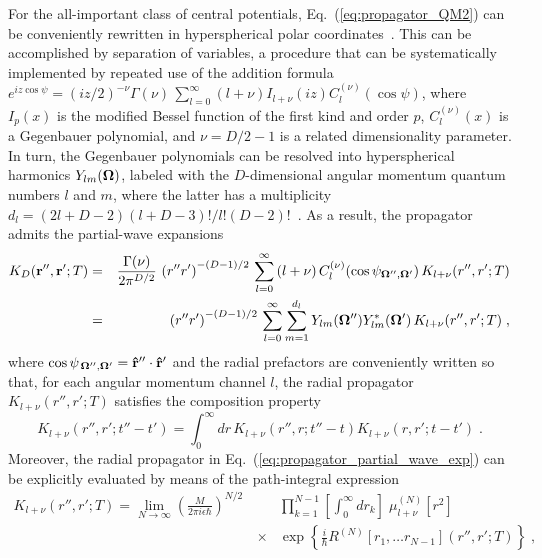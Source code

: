 \documentclass[a4paper,preprint,draft,showpacs,amsmath,amsfonts,amssymb,aps,prd]{revtex4}%
\begin{document}
For the all-important class of central potentials,
Eq.~(\ref{eq:propagator_QM2}) can be conveniently rewritten 
in hyperspherical  polar coordinates~\cite{cam:00,cam:01,erd:53}.
This can be accomplished by separation of variables, 
a procedure that can be systematically
implemented by repeated use of the addition formula~\cite{wat:44}
$e^{iz\cos \psi}
=
(iz/2)^{-\nu} \Gamma (\nu)
\,
 \sum_{l=0}^{\infty} 
(l+\nu)
I_{l+\nu} (iz ) C_{l}^{(\nu)} (\cos \psi )$,
where $I_{p}(x)$ 
is the modified Bessel function of the first kind and order $p$,
$C_{l}^{(\nu)}(x)$ is a Gegenbauer polynomial, and
$\nu =D/2 -1$ is a related dimensionality parameter.
In turn, the Gegenbauer polynomials can be resolved into 
hyperspherical harmonics
$Y_{l m} ({\bf \Omega})$, 
labeled with the $D$-dimensional angular momentum quantum numbers
$l$ and $m$, where the latter has a multiplicity
 $d_{l}= (2l+D-2)(l+D-3)!/l!(D-2)!$~\cite{erd:53}.
As a result,
the propagator admits the
partial-wave expansions
\begin{eqnarray}
K_{D}({\bf r}'', {\bf r}' ; T) 
& = &
\frac{\Gamma (\nu)}{2 \pi^{D/2} }
\,
\left( r'' r' \right)^{-(D-1)/2}
\,
\sum_{l= 0}^{\infty}
\,
(l+\nu)
\,
C_{l}^{(\nu)} (\cos \psi_{ {\bf \Omega}'', {\bf \Omega}' } ) 
\,
K_{l +\nu}(r'',r';T)
\nonumber
\\
& = &
\left( r'' r' \right)^{-(D-1)/2}
\,
\sum_{l= 0}^{\infty}
\sum_{m=1}^{d_{l}}
Y_{l m} ({\bf \Omega}'')
Y_{l m}^{ *} ({\bf \Omega}')
\,
K_{l +\nu}(r'',r';T)
\;  ,
\label{eq:propagator_partial_wave_exp}
\end{eqnarray}
where $\cos \psi_{ \, {\bf \Omega}'', {\bf \Omega}' } = {\bf \hat{r}}'' \cdot {\bf \hat{r}}' $ and
the radial prefactors are conveniently written so that,
for each angular momentum channel $l$,  
the radial propagator
$K_{l+\nu}(r'',r';T)$ satisfies the composition property
\begin{equation}
K_{l+\nu}(r'',r';t''-t')
=
\int_{0}^{\infty}
dr
\,
K_{l+\nu}(r'',r;t''-t)
K_{l+\nu}(r,r';t-t')
\;  .
\end{equation}
Moreover,
the radial propagator in
Eq.~(\ref{eq:propagator_partial_wave_exp}) 
can be explicitly evaluated by means of the
path-integral expression
\begin{eqnarray}
K_{l+\nu}(r'',r';T)  = 
\lim_{N \rightarrow \infty}
\left( \frac{M}{2 \pi i \epsilon \hbar} \right)^{N/2}
\,
&   &
\prod_{k=1}^{N-1}
\left[ 
 \int_{0}^{\infty} d r_{k}
\right]
\;  
\mu_{l+\nu}^{(N)} [r^{2}] 
\,
\nonumber  \\
&  \times  &
\exp \left\{
\frac{i}{\hbar} 
R^{(N)}  
 \left[ 
 r_{1},
\dots
 r_{N-1}
\right]  (r'', r' ; T)  
\right\}
\;   ,
\label{eq:propagator_QM_spherical_coords_2D_expansion}
\end{eqnarray}
\end{document}
